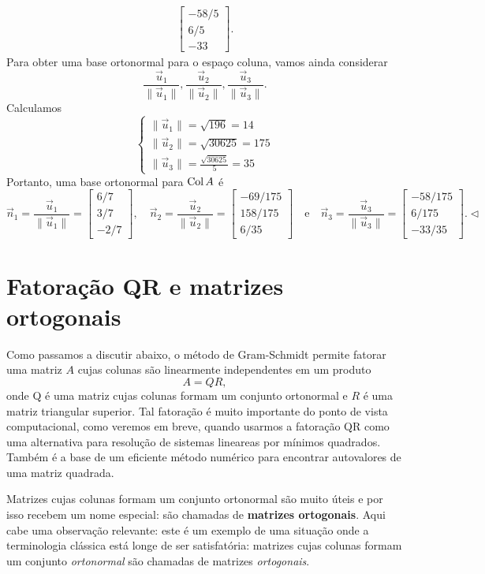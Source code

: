 \documentclass[../livro.tex]{subfiles}  %
\begin{document}
\begin{example}
\begin{align*}
\begin{bmatrix}
 -58/5  \\
 6/5  \\
 -33
\end{bmatrix}.
  \end{align*}
  Para obter uma base ortonormal para o espaço coluna, vamos ainda considerar
\[
\frac{\vec{u}_1}{\|\vec{u}_1\|}, \frac{\vec{u}_2}{\|\vec{u}_2\|}, \frac{\vec{u}_3}{\|\vec{u}_3\|}.
\] Calculamos
\[
\left\{
  \begin{array}{ll}
   \|\vec{u}_1\| = \sqrt{196} = 14 \\
   \|\vec{u}_2\| = \sqrt{30625} = 175 \\
   \|\vec{u}_3\| = \frac{\sqrt{30625}}{5} = 35
  \end{array}
\right.
\] Portanto, uma base ortonormal para $\operatorname{Col} A$ é
\[
\vec{n}_1 = \frac{\vec{u}_1}{\|\vec{u}_1\|} =
\begin{bmatrix}
 6/7  \\
 3/7  \\
 -2/7
\end{bmatrix}, \quad
\vec{n}_2 = \frac{\vec{u}_2}{\|\vec{u}_2\|} =
\begin{bmatrix}
 -69/175  \\
 158/175  \\
 6/35
\end{bmatrix} \quad \text{e} \quad
\vec{n}_3 = \frac{\vec{u}_3}{\|\vec{u}_3\|} =
\begin{bmatrix}
 -58/175  \\
 6/175  \\
 -33/35
\end{bmatrix}. \lhd
\]
\end{example}


\section{Fatoração QR e matrizes ortogonais}


Como passamos a discutir abaixo, o método de Gram-Schmidt permite fatorar uma matriz $A$ cujas colunas são linearmente independentes em um produto \[A=QR,\] onde Q é uma matriz cujas colunas formam um conjunto ortonormal e $R$ é uma matriz triangular superior. Tal fatoração é muito importante do ponto de vista computacional, como veremos em breve, quando usarmos a fatoração QR como uma alternativa para resolução de sistemas lineareas por mínimos quadrados. Também é a base de um eficiente método numérico para encontrar autovalores de uma matriz quadrada.

Matrizes cujas colunas formam um conjunto ortonormal são muito úteis e por isso recebem um nome especial: são chamadas de \textbf{matrizes ortogonais}. Aqui cabe uma observação relevante: este é um exemplo de uma situação onde a terminologia clássica está longe de ser satisfatória: matrizes  cujas colunas formam um conjunto {\it ortonormal} são chamadas de matrizes {\it ortogonais}.   
\end{document}
